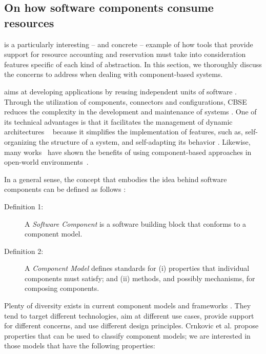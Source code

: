 \subsection{On how software components consume resources} \label{sec:components-oriented-resource-awareness}

 is a particularly interesting -- and concrete -- example of how tools that provide support for resource accounting and reservation must take into consideration features specific of each kind of abstraction.
In this section, we thoroughly discuss the concerns to address when dealing with component-based systems.  

 aims at developing applications by reusing independent units of software \cite{cbse-conference, Crnkovic2011}.
Through the utilization of components, connectors and configurations, CBSE reduces the complexity in the development and maintenance of systems \cite{xadl,Medvidovic:2000,VanOmmering-et-al-00}.
One of its technical advantages is that it facilitates the management of dynamic architectures
~\cite{DBLP:journals/ase/NittoGMPP08, Johnson:2015:CSM:2735960.2735979}
because it simplifies the implementation of features, such as, self-organizing the structure of a system, and self-adapting its behavior
\cite{PanzicaLaManna:2012:LDU:2304736.2304764, Johnson:2015:CSM:2735960.2735979,Zhang:2009:MVD:1509239.1509262}.
Likewise, many works~\cite{cbse-conference} have shown the benefits of using component-based approaches in open-world environments~\cite{baresi2006toward, Caporuscio:2010:AIA:1985522.1985547, Perez-Palacin:2010:PAO:1712605.1712614}.

In a general sense, the concept that embodies the idea behind software components can be defined as follows
\cite{Crnkovic2011}:

\begin{description}
\item[Definition 1:] A \textit{Software Component} is a software building block that conforms to a component model. 
\item[Definition 2:] A \textit{Component Model} defines standards for (i) properties that individual components must satisfy; and (ii) methods, and possibly mechanisms, for composing components.
\end{description}

Plenty of diversity exists in current component models and frameworks \cite{Heineman2001, SZYPERSKI2002, Crnkovic2011}.
They tend to target different technologies, aim at different use cases, provide support for different concerns, and use different design principles.
Crnkovic et al. \cite{Crnkovic2011} propose properties that can be used to classify component models; we are interested in those models that have the following properties:

